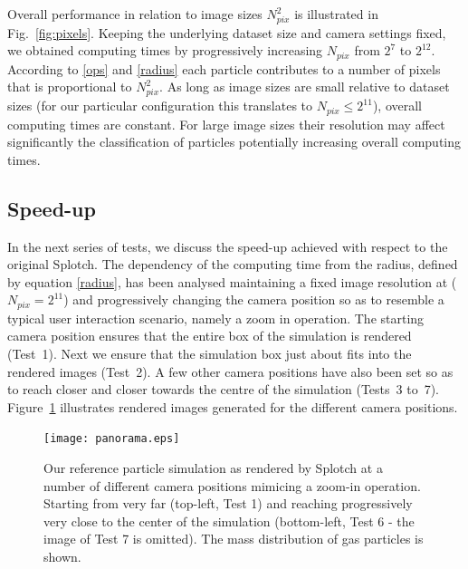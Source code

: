 \documentclass[preprint,5pt]{elsarticle}
\begin{document}
Overall performance in relation to image sizes $N_{pix}^2$ is illustrated in Fig.~\ref{fig:pixels}. Keeping the underlying dataset size and camera settings fixed, we obtained computing times by progressively increasing
$N_{pix}$ from ${2}^{7}$ to ${2}^{12}$. According to \eqref{ops} and \eqref{radius} each particle contributes to a number of pixels that is proportional to $N_{pix}^{2}$. As long as image sizes are small relative to dataset sizes (for our particular configuration this translates to $N_{pix} \le 2^{11}$), overall computing times are constant. For large image sizes their resolution may affect significantly the classification of particles potentially increasing overall computing times.

\subsection{Speed-up}
\label{sec:speed-up}

In the next series of tests, we discuss the speed-up achieved with respect to the original Splotch. 
The dependency of the computing time from the radius, defined by equation \eqref{radius}, has been analysed maintaining a fixed image resolution at ($N_{pix} = 2^{11}$) and progressively changing the camera position 
so as to resemble a typical user interaction scenario, namely a zoom in operation. 
The starting camera position ensures that the entire box of the simulation is rendered (Test~1). 
Next we ensure that the simulation box just about fits into the rendered images (Test~2). 
A few other camera positions have also been set so as to reach closer and closer towards the 
centre of the simulation (Tests~3 to~7). Figure~\ref{fig:panorama} illustrates rendered images generated for the different camera positions.

\begin{figure}
\centering
\texttt{[image: panorama.eps]}
\caption{Our reference particle simulation as rendered by Splotch at a number of different camera positions mimicing a zoom-in operation. Starting from very far (top-left, Test 1) and reaching progressively very close to the center of the simulation (bottom-left, Test 6 - the image of Test 7 is omitted). The mass distribution of gas particles is shown.}
\label{fig:panorama}
\end{figure}
\end{document}

